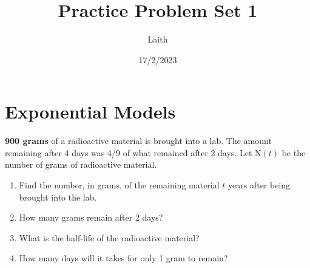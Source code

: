 \documentclass{article}
\title{Practice Problem Set 1}
\author{Laith}
\date{17/2/2023}
\numberwithin{equation}{section}
\numberwithin{equation}{section}
\begin{document}
\maketitle
\newpage

\section{Exponential Models}
\textbf{900 grams} of a radioactive material is brought into a lab.
The amount remaining after 4 days was 4/9 of what remained after 2 
days. Let $\mathrm{N}(t)$ be the number of grams of radioactive material.
\begin{enumerate}[label=(\alph*)]
    \item Find the number, in grams, of the remaining material $t$ years 
    after being brought into the lab.
    \item How many grams remain after 2 days?
    \item What is the half-life of the radioactive material?
    \item How many days will it takes for only 1 gram to remain? 
\end{enumerate}
\end{document}

